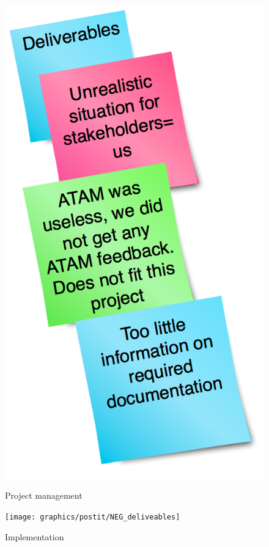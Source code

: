 \documentclass[titlepage,a4paper,11pt]{article}
\begin{document}
\begin{figure}[H]
    \begin{minipage}[b]{0.5\linewidth}
        \centering
        \includegraphics[scale=0.4]{graphics/postit/NEG_deliverables}
        \caption{Project management}
        \label{fig:neg3}
    \end{minipage}
    \hspace{0.5cm}
    \begin{minipage}[b]{0.5\linewidth}
        \centering
        \texttt{[image: graphics/postit/NEG\_deliveables]}
        \caption{Implementation}
        \label{fig:neg4}
    \end{minipage}
\end{figure}
\end{document}
